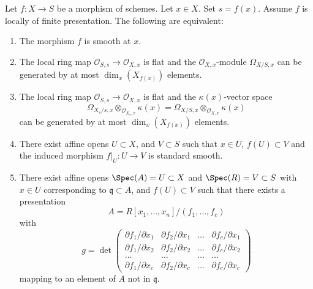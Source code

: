 \begin{lemma}
\label{lemma-smooth-at-point}
Let $f : X \to S$ be a morphism of schemes.
Let $x \in X$.
Set $s = f(x)$.
Assume $f$ is locally of finite presentation.
The following are equivalent:
\begin{enumerate}
\item The morphism $f$ is smooth at $x$.
\item The local ring map $\mathcal{O}_{S, s} \to \mathcal{O}_{X, x}$
is flat and the $\mathcal{O}_{X, x}$-module $\Omega_{X/S, x}$
can be generated by at most $\dim_x(X_{f(x)})$ elements.
\item The local ring map $\mathcal{O}_{S, s} \to \mathcal{O}_{X, x}$
is flat and the $\kappa(x)$-vector space
$$
\Omega_{X_s/s, x} \otimes_{\mathcal{O}_{X_s, x}} \kappa(x) =
\Omega_{X/S, x} \otimes_{\mathcal{O}_{X, x}} \kappa(x)
$$
can be generated by at most $\dim_x(X_{f(x)})$ elements.
\item There exist affine opens $U \subset X$,
and $V \subset S$ such that $x \in U$, $f(U) \subset V$ and the
induced morphism $f|_U : U \to V$ is standard smooth.
\item There exist affine opens $\Spec(A) = U \subset X$
and $\Spec(R) = V \subset S$ with $x \in U$ corresponding
to $\mathfrak q \subset A$, and $f(U) \subset V$
such that there exists a presentation
$$
A = R[x_1, \ldots, x_n]/(f_1, \ldots, f_c)
$$
with
$$
g =
\det
\left(
\begin{matrix}
\partial f_1/\partial x_1 &
\partial f_2/\partial x_1 &
\ldots &
\partial f_c/\partial x_1 \\
\partial f_1/\partial x_2 &
\partial f_2/\partial x_2 &
\ldots &
\partial f_c/\partial x_2 \\
\ldots & \ldots & \ldots & \ldots \\
\partial f_1/\partial x_c &
\partial f_2/\partial x_c &
\ldots &
\partial f_c/\partial x_c
\end{matrix}
\right)
$$
mapping to an element of $A$ not in $\mathfrak q$.
\end{enumerate}
\end{lemma}


